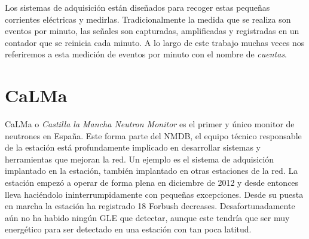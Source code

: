         \par
        Los sistemas de adquisición están diseñados para recoger estas pequeñas corrientes eléctricas y medirlas. Tradicionalmente la medida que se
        realiza son eventos por minuto, las señales son capturadas, amplificadas y registradas en un contador que se reinicia cada minuto. A lo largo
        de este trabajo muchas veces nos referiremos a esta medición de eventos por minuto con el nombre de \emph{cuentas}. 

    \section{CaLMa}
        CaLMa\cite{Medina2013} o \emph{Castilla la Mancha Neutron Monitor} es el primer y único monitor de neutrones en España. Este forma parte del
        NMDB, el equipo técnico responsable de la estación está profundamente implicado en desarrollar sistemas y herramientas que mejoran la red. Un
        ejemplo es el sistema de adquisición implantado en la estación, también implantado en otras estaciones de la red. La estación empezó a operar
        de forma plena en diciembre de 2012 y desde entonces lleva haciéndolo ininterrumpidamente con pequeñas excepciones. Desde su puesta en marcha
        la estación ha registrado 18 Forbush decreases. Desafortunadamente aún no ha habido ningún GLE que detectar, aunque este tendría que ser muy
        energético para ser detectado en una estación con tan poca latitud.

